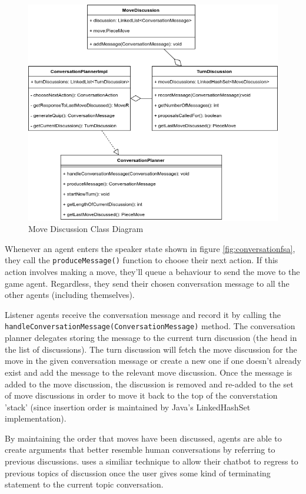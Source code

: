 \documentclass[conference]{IEEEtran}
\begin{document}
\begin{figure}[!h]
	\centering
	\includegraphics[width=\linewidth]{images/movediscussion}
	\caption{Move Discussion Class Diagram}
	\label{fig:movediscussion}
\end{figure}

Whenever an agent enters the speaker state shown in figure \ref{fig:conversationfsa}, they call the \lstinline{produceMessage()} function to choose their next action. If this action involves making a move, they'll queue a behaviour to send the move to the game agent. Regardless, they send their chosen conversation message to all the other agents (including themselves).

Listener agents receive the conversation message and record it by calling the \lstinline{handleConversationMessage(ConversationMessage)} method. The conversation planner delegates storing the message to the current turn discussion (the head in the list of discussions). The turn discussion will fetch the move discussion for the move in the given conversation message or create a new one if one doesn't already exist and add the message to the relevant move discussion. Once the message is added to the move discussion, the discussion is removed and re-added to the set of move discussions in order to move it back to the top of the converstation 'stack' (since insertion order is maintained by Java's LinkedHashSet implementation). 

By maintaining the order that moves have been discussed, agents are able to create arguments that better resemble human conversations by referring to previous discussions. \cite{tartan} uses a similiar technique to allow their chatbot to regress to previous topics of discussion once the user gives some kind of terminating statement to the current topic conversation. 
\end{document}
